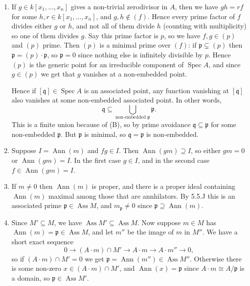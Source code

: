 \documentclass{report}
\newcommand{\p}{\mathfrak{p}}
\newcommand{\q}{\mathfrak{q}}
\DeclareMathOperator{\Spec}{Spec}
\DeclareMathOperator{\Ann}{Ann}
\DeclareMathOperator{\Ass}{Ass}
\begin{document}
\begin{enumerate}[label=\textbf{5.5.\Alph*.}]
	\item If $g\in k[x_1,\ldots,x_n]$ gives a non-trivial zerodivisor in $A$,
	      then we have $gh=rf$ for some $h,r\in k[x_1,\ldots,x_n]$, and
	      $g,h\notin(f)$. Hence every prime factor of $f$ divides either $g$ or
	      $h$, and not all of them divide $h$ (counting with multiplicity) so
	      one of them divides $g$. Say this prime factor is $p$, so we have
	      $f,g\in(p)$ and $(p)$ prime. Then $(p)$ is a minimal prime over $(f)$:
	      if $\p\subsetneq(p)$ then $\p=(p)\cdot\p$, so $\p=0$ since nothing
	      else is infinitely divisible by $p$. Hence $(p)$ is the generic point
	      for an irreducible component of $\Spec A$, and since $g\in(p)$ we get
	      that $g$ vanishes at a non-embedded point.

	      Hence if $[\q]\in\Spec A$ is an associated point, any function
	      vanishing at $[\q]$ also vanishes at some non-embedded associated
	      point. In other words,
	      \begin{equation*}
		      \q \subseteq \bigcup_{\text{non-embedded $\p$}}\p.
	      \end{equation*}
	      This is a finite union because of (B), so by prime avoidance
	      $\q\subseteq\p$ for some non-embedded $\p$. But $\p$ is minimal, so
	      $\q=\p$ is non-embedded.

	\item Suppose $I=\Ann(m)$ and $fg\in I$. Then $\Ann(gm)\supseteq I$, so
	      either $gm=0$ or $\Ann(gm)=I$. In the first case $g\in I$, and in the
	      second case $f\in\Ann(gm)=I$.

	\item If $m\ne0$ then $\Ann(m)$ is proper, and there is a proper ideal
	      containing $\Ann(m)$ maximal among those that are annhilators. By
	      5.5.J this is an associated prime $\p\in\Ass M$, and $m_\p\ne0$ since
	      $\p\supseteq\Ann(m)$.

	\item Since $M'\subseteq M$, we have $\Ass M'\subseteq\Ass M$. Now suppose
	      $m\in M$ has $\Ann(m)=\p\in\Ass M$, and let $m''$ be the image of $m$
	      in $M''$. We have a short exact sequence
	      \begin{equation*}
		      0 \to (A\cdot m)\cap M' \to A\cdot m \to A\cdot m'' \to 0,
	      \end{equation*}
	      so if $(A\cdot m)\cap M'=0$ we get $\p=\Ann(m'')\in\Ass M''$. Otherwise
	      there is some non-zero $x\in (A\cdot m)\cap M'$, and $\Ann(x)=\p$
	      since $A\cdot m\cong A/\p$ is a domain, so $\p\in\Ass M'$.


\end{enumerate}
\end{document}

